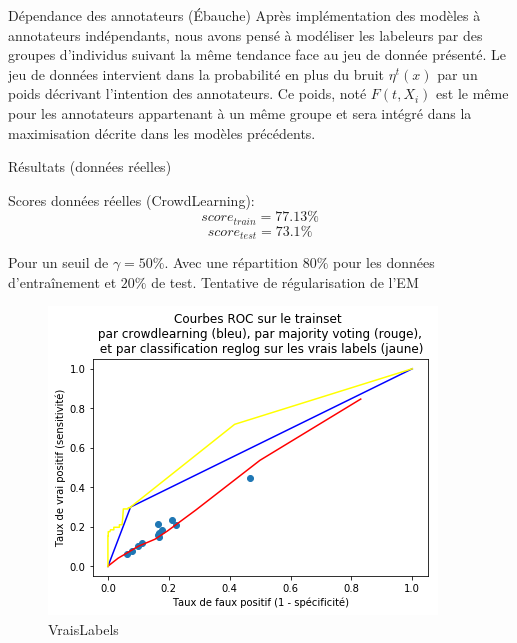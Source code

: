 \documentclass[final]{beamer}
\newlength{\onecolwid}
\begin{document}
\begin{frame}[t]
\begin{columns}[t]
\begin{column}{\onecolwid}

\begin{block}{Dépendance des annotateurs (Ébauche)}
Après implémentation des modèles à annotateurs indépendants, nous avons pensé à modéliser les labeleurs par des groupes d'individus suivant la même tendance face au jeu de donnée présenté.
\newline
Le jeu de données intervient dans la probabilité en plus du bruit $\eta^t(x)$ par un poids décrivant l'intention des annotateurs. Ce poids, noté $F(t,X_i)$ est le même pour les annotateurs appartenant à un même groupe et sera intégré dans la maximisation décrite dans les modèles précédents.

\end{block}

\begin{block}{Résultats (données réelles)}

Scores données réelles (CrowdLearning):
$$score_{train} = 77.13 \%$$
$$ score_{test} = 73.1 \%$$

\noindent

Pour un seuil de $ \gamma = 50 \%$.
Avec une répartition $ 80\%$ pour les données d'entraînement et $20\%$ de test.
\newline
Tentative de régularisation de l'EM


  \begin{minipage}{0.45\textwidth}
    \begin{figure}
    \centering
    \includegraphics[scale=0.85]{DonneesRellesROC.png}
    \caption{VraisLabels}
    \label{fig:my_label}
\end{figure}


\end{minipage}
\end{block}
\end{column}
\end{columns}
\end{frame}
\end{document}
